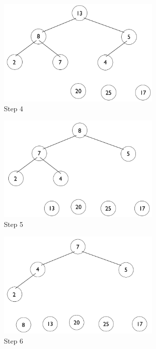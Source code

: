 \documentclass[11pt,letterpaper]{article}
\begin{document}
\begin{figure}[!ht]

	\begin{center}
	\includegraphics[width=80mm]{images/6_4_1_4_tree.png}
	\end{center}

\caption{Step 4 }
\end{figure}

\pagebreak

\begin{figure}[!ht]

	\begin{center}
	\includegraphics[width=80mm]{images/6_4_1_5_tree.png}
	\end{center}

\caption{Step 5 }
\end{figure}

\begin{figure}[!ht]

	\begin{center}
	\includegraphics[width=80mm]{images/6_4_1_6_tree.png}
	\end{center}

\caption{Step 6 }
\end{figure}
\end{document}
